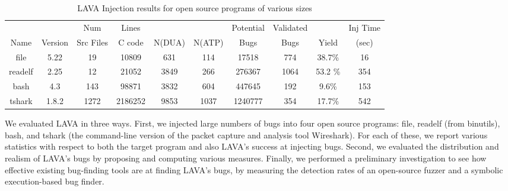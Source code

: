 \label{section:results}

\begin{table}[t]
\caption{LAVA Injection results for open source programs of various sizes}
\centering\footnotesize
\begin{tabular}{c|c|c|c|c|c|c|c|c|c}
        &         & Num       & Lines     &        &        & Potential & Validated  &         & Inj Time \\
Name    & Version & Src Files & C code    & N(DUA) & N(ATP) & Bugs      & Bugs       & Yield   & (sec)  \\\hline
file    & 5.22    & 19        & 10809     & 631    & 114    & 17518     & 774        & 38.7\%  & 16         \\  %
readelf & 2.25    & 12        & 21052     & 3849   & 266    & 276367    & 1064       & 53.2 \% & 354     \\  %
bash    & 4.3     & 143       & 98871     & 3832   & 604    & 447645    & 192        & 9.6\%   & 153     \\  %
tshark  & 1.8.2   & 1272      & 2186252   & 9853   & 1037   & 1240777   & 354        & 17.7\%  & 542     \\
\end{tabular} 
\label{table:insertion-results}
\end{table}

We evaluated LAVA in three ways.
First, we injected large numbers of bugs into four open source programs: file, readelf (from binutils), bash, and tshark (the command-line version of the packet capture and analysis tool Wireshark).
For each of these, we report various statistics with respect to both the target program and also LAVA's success at injecting bugs.
Second, we evaluated the distribution and realism of LAVA's bugs by proposing and computing various measures.
Finally, we performed a preliminary investigation to see how effective existing bug-finding tools are at finding LAVA's bugs, by measuring the detection rates of an open-source fuzzer and a symbolic execution-based bug finder.

